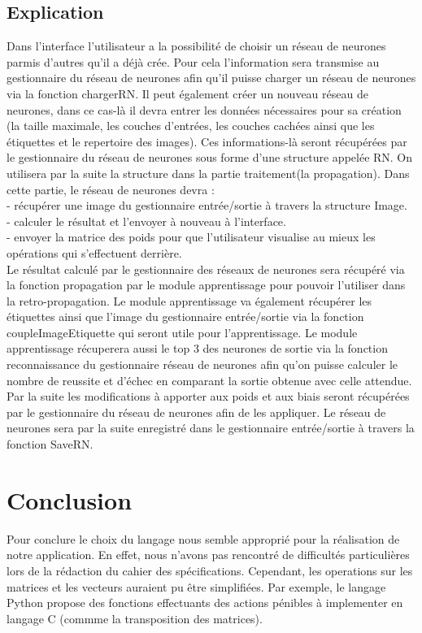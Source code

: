 \documentclass{article}
\begin{document}
	\subsection{Explication}	
	Dans l'interface l'utilisateur a la possibilité de choisir un réseau de neurones parmis d'autres qu'il a déjà crée.
Pour cela l'information sera transmise au gestionnaire du réseau de neurones afin qu'il puisse charger un réseau de neurones via la fonction chargerRN.
Il peut également créer un nouveau réseau de neurones, dans ce cas-là il devra entrer les données nécessaires pour sa création (la taille maximale, les couches d'entrées, les couches cachées ainsi que les étiquettes et le repertoire des images). 
Ces informations-là seront récupérées par le gestionnaire du réseau de neurones sous forme d'une structure appelée RN. 
On utilisera par la suite la structure dans la partie traitement(la propagation).
Dans cette partie, le réseau de neurones devra : \\
- récupérer une image du gestionnaire entrée/sortie à travers la structure Image.\\
- calculer le résultat et l'envoyer à nouveau à l'interface.\\
- envoyer la matrice des poids pour que l'utilisateur visualise au mieux les opérations qui s'effectuent derrière.\\
Le résultat calculé par le gestionnaire des réseaux de neurones sera récupéré via la fonction propagation par le module apprentissage pour pouvoir l'utiliser dans la retro-propagation.
Le module apprentissage va également récupérer les étiquettes ainsi que l'image du gestionnaire entrée/sortie via la fonction coupleImageEtiquette qui seront utile pour l'apprentissage.
Le module apprentissage récuperera aussi le top 3 des neurones de sortie via la fonction reconnaissance du gestionnaire réseau de neurones afin qu'on puisse calculer le nombre de reussite et d'échec en comparant la sortie obtenue avec celle attendue.
Par la suite les modifications à apporter aux poids et aux biais seront récupérées par le gestionnaire du réseau de neurones afin de les appliquer.
Le réseau de neurones sera par la suite enregistré dans le gestionnaire entrée/sortie à travers la fonction SaveRN.	

\section{Conclusion}
Pour conclure le choix du langage nous semble approprié pour la réalisation de notre application. En effet, nous n'avons pas rencontré de difficultés particulières lors de la rédaction du cahier des spécifications.
 Cependant, les operations sur les matrices et les vecteurs auraient pu être simplifiées. 
 Par exemple, le langage Python propose des fonctions effectuants des actions pénibles à implementer en langage C (commme la transposition des matrices).
\end{document}
